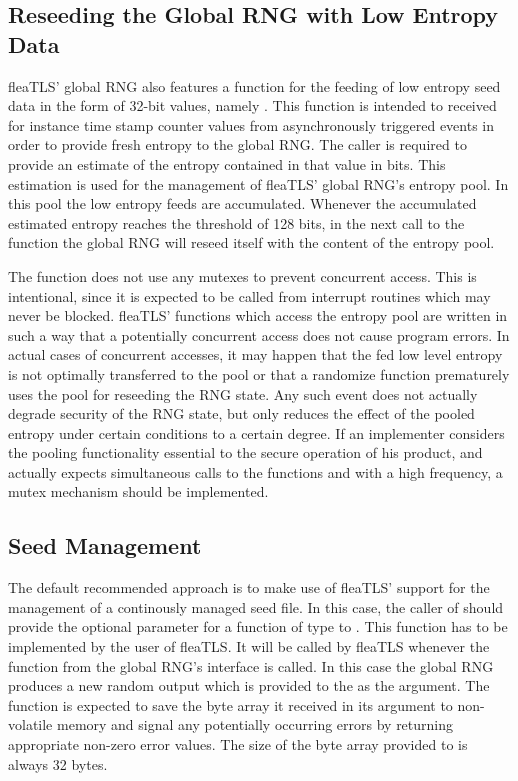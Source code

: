 \documentclass[a4paper,11pt]{scrartcl}
\begin{document}
\subsection{Reseeding the Global RNG with Low Entropy Data}
\label{secLowEntropyReseed}
fleaTLS' global RNG also features a function for the feeding of low entropy seed
data in the form of 32-bit values, namely
. This function is
intended to received for instance time stamp counter values from asynchronously
triggered events in order to provide fresh entropy to the global RNG. The caller
is required to provide an estimate of the entropy contained in that value in
bits. This estimation is used for the management of fleaTLS' global RNG's
entropy pool. In this pool the low entropy feeds are accumulated. Whenever the
accumulated estimated entropy reaches the threshold of 128 bits, in the next
call to the function  the global RNG will
reseed itself with the content of the entropy pool. 

The function  does not
use any mutexes to prevent concurrent access. This is intentional, since it is
expected to be called from interrupt routines which may never be blocked.
fleaTLS' functions which access the
entropy pool are written in such a way that a potentially concurrent access does
not cause program errors. In actual cases of concurrent accesses, it may happen that
the fed low level entropy is not optimally transferred to the pool or that a
randomize function prematurely uses the pool for reseeding the RNG state. Any
such event does not actually degrade security of the RNG state, but only reduces the effect of
the pooled entropy under certain conditions to a certain degree. If an
implementer considers the pooling functionality essential to the secure
operation of his product, and actually expects simultaneous calls to the functions
 and
 with a high frequency, a mutex mechanism should be implemented.

\subsection{Seed Management}
\label{secSeedFile}
The default recommended approach is to make use of fleaTLS' support for
the management of a continously managed seed file. In this case, the caller
of \funcLibInit should provide the optional parameter for a function of type
 to \funcLibInit. This function has to be implemented
by the user of fleaTLS. It will be called by
fleaTLS whenever the function  from
the global RNG's interface is called. In this case the global RNG produces a new
random output which is provided to the  as the
argument. The function is expected to save the byte array it received in its
argument to non-volatile memory and signal any potentially occurring errors by
returning appropriate non-zero error values. The size of the byte array provided
to \funcSaveRngState is always 32 bytes.
\end{document}
